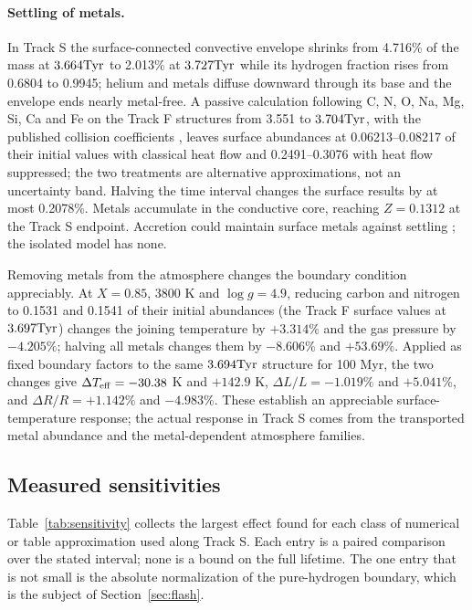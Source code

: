 \paragraph{Settling of metals.}
In Track S the surface-connected convective envelope shrinks from 4.716\%
of the mass at $3.664\mathrm{Tyr}$ to 2.013\% at $3.727\mathrm{Tyr}$ while its hydrogen
fraction rises from 0.6804 to 0.9945; helium and metals diffuse downward
through its base and the envelope ends nearly metal-free. A passive
calculation following C, N, O, Na, Mg, Si, Ca and Fe on the Track F
structures from 3.551 to $3.704\mathrm{Tyr}$, with the published collision
coefficients \cite{thoul94}, leaves surface abundances at 0.06213--0.08217
of their initial values with classical heat flow and 0.2491--0.3076 with heat
flow suppressed; the two treatments are alternative approximations, not an
uncertainty band. Halving the time interval changes the surface results by
at most 0.2078\%. Metals accumulate in the conductive core, reaching
$Z=0.1312$ at the Track S endpoint. Accretion could maintain surface metals
against settling \cite{bauer19}; the isolated model has none.

Removing metals from the atmosphere changes the boundary condition
appreciably. At $X=0.85$, 3800 K and $\log g=4.9$, reducing carbon and
nitrogen to 0.1531 and 0.1541 of their initial abundances (the Track F
surface values at $3.697\mathrm{Tyr}$) changes the joining temperature by $+3.314\%$
and the gas pressure by $-4.205\%$; halving all metals changes them by
$-8.606\%$ and $+53.69\%$. Applied as fixed boundary factors to the same
$3.694\mathrm{Tyr}$ structure for 100 Myr, the two changes give
$\Delta T_{\rm eff}=-30.38$ K and $+142.9$ K, $\Delta L/L=-1.019\%$ and
$+5.041\%$, and $\Delta R/R=+1.142\%$ and $-4.983\%$. These establish an
appreciable surface-temperature response; the actual response in Track S
comes from the transported metal abundance and the metal-dependent
atmosphere families.

\subsection{Measured sensitivities}
Table~\ref{tab:sensitivity} collects the largest effect found for each
class of numerical or table approximation used along Track S. Each entry is
a paired comparison over the stated interval; none is a bound on the full
lifetime. The one entry that is not small is the absolute normalization of
the pure-hydrogen boundary, which is the subject of Section~\ref{sec:flash}.

